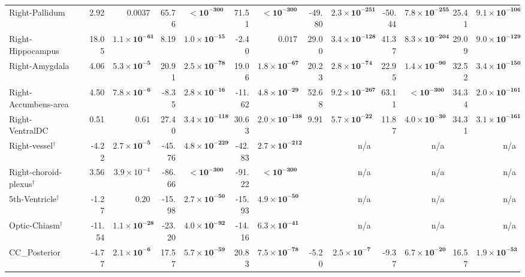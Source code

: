 {\begin{longtable}{llrrrrrrrrrrrr}
Right-Pallidum &  & 2.92 & $0.0037$ & 65.76 & $\mathbf{{<}10^{-300}}$ & 71.51 & $\mathbf{{<}10^{-300}}$ & -49.80 & $\mathbf{2.3{\times}10^{-251}}$ & -50.44 & $\mathbf{7.8{\times}10^{-255}}$ & 25.41 & $\mathbf{9.1{\times}10^{-106}}$ \\
Right-Hippocampus &  & 18.05 & $\mathbf{1.1{\times}10^{-61}}$ & 8.19 & $\mathbf{1.0{\times}10^{-15}}$ & -2.40 & $0.017$ & 29.00 & $\mathbf{3.4{\times}10^{-128}}$ & 41.37 & $\mathbf{8.3{\times}10^{-204}}$ & 29.09 & $\mathbf{9.0{\times}10^{-129}}$ \\
Right-Amygdala &  & 4.06 & $\mathbf{5.3{\times}10^{-5}}$ & 20.91 & $\mathbf{2.5{\times}10^{-78}}$ & 19.06 & $\mathbf{1.8{\times}10^{-67}}$ & 20.23 & $\mathbf{2.8{\times}10^{-74}}$ & 22.95 & $\mathbf{1.4{\times}10^{-90}}$ & 32.52 & $\mathbf{3.4{\times}10^{-150}}$ \\
Right-Accumbens-area &  & 4.50 & $\mathbf{7.8{\times}10^{-6}}$ & -8.35 & $\mathbf{2.8{\times}10^{-16}}$ & -11.62 & $\mathbf{4.8{\times}10^{-29}}$ & 52.68 & $\mathbf{9.2{\times}10^{-267}}$ & 63.11 & $\mathbf{{<}10^{-300}}$ & 34.34 & $\mathbf{2.0{\times}10^{-161}}$ \\
Right-VentralDC &  & 0.51 & $0.61$ & 27.40 & $\mathbf{3.4{\times}10^{-118}}$ & 30.63 & $\mathbf{2.0{\times}10^{-138}}$ & 9.91 & $\mathbf{5.7{\times}10^{-22}}$ & 11.87 & $\mathbf{4.0{\times}10^{-30}}$ & 34.31 & $\mathbf{3.1{\times}10^{-161}}$ \\
Right-vessel$^{\dagger}$ &  & -4.22 & $\mathbf{2.7{\times}10^{-5}}$ & -45.76 & $\mathbf{4.8{\times}10^{-229}}$ & -42.83 & $\mathbf{2.7{\times}10^{-212}}$ &  & n/a &  & n/a &  & n/a \\
Right-choroid-plexus$^{\dagger}$ &  & 3.56 & $3.9{\times}10^{-4}$ & -86.66 & $\mathbf{{<}10^{-300}}$ & -91.22 & $\mathbf{{<}10^{-300}}$ &  & n/a &  & n/a &  & n/a \\
5th-Ventricle$^{\dagger}$ &  & -1.27 & $0.20$ & -15.98 & $\mathbf{2.7{\times}10^{-50}}$ & -15.93 & $\mathbf{4.9{\times}10^{-50}}$ &  & n/a &  & n/a &  & n/a \\
Optic-Chiasm$^{\dagger}$ &  & -11.54 & $\mathbf{1.1{\times}10^{-28}}$ & -23.20 & $\mathbf{4.0{\times}10^{-92}}$ & -14.16 & $\mathbf{6.3{\times}10^{-41}}$ &  & n/a &  & n/a &  & n/a \\
CC\_Posterior &  & -4.77 & $\mathbf{2.1{\times}10^{-6}}$ & 17.57 & $\mathbf{5.7{\times}10^{-59}}$ & 20.83 & $\mathbf{7.5{\times}10^{-78}}$ & -5.20 & $\mathbf{2.5{\times}10^{-7}}$ & -9.37 & $\mathbf{6.7{\times}10^{-20}}$ & 16.57 & $\mathbf{1.9{\times}10^{-53}}$ \\

\end{longtable}}
